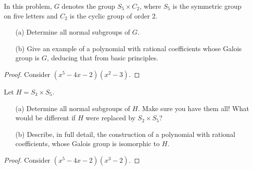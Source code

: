 \begin{prob}[S2012-Q3]
    In this problem, \(G\) denotes the group \(S_5 \times C_2\), where \(S_5\) is the symmetric group on five letters and \(C_2\) is the cyclic group of order 2.
    \begin{itemize}
        \item[(a)] Determine all normal subgroups of \(G\).
        \item[(b)] Give an example of a polynomial with rational coefficients whose Galois group is \(G\), deducing that from basic principles.
    \end{itemize}
\end{prob}
\begin{proof}
    Consider $(x^5-4x-2)(x^2-3)$.
\end{proof}


\begin{prob}[F2015-Q4]
    Let \(H = S_3 \times S_5\).
    \begin{itemize}
        \item[(a)] Determine all normal subgroups of \(H\). Make sure you have them all! What would be different if \(H\) were replaced by \(S_2 \times S_5\)?
        \item[(b)] Describe, in full detail, the construction of a polynomial with rational coefficients, whose Galois group is isomorphic to \(H\).
    \end{itemize}
\end{prob}
\begin{proof}
    Consider $(x^5-4x-2)(x^3-2)$.
\end{proof}






